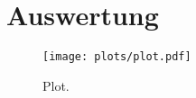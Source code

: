 \section{Auswertung}


\begin{figure}
  \centering
  \texttt{[image: plots/plot.pdf]}
  \caption{Plot.}
  \label{fig:plot}
\end{figure}
